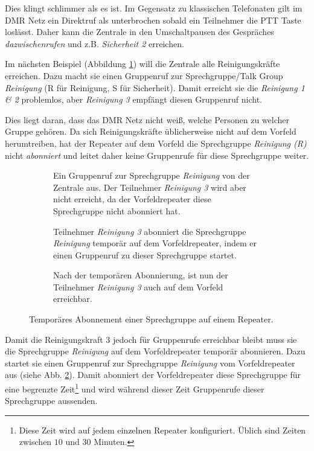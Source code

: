 Dies klingt schlimmer als es ist. Im Gegensatz zu klassischen Telefonaten gilt im DMR Netz ein Direktruf als unterbrochen sobald ein Teilnehmer die PTT Taste loslässt. Daher kann die Zentrale in den Umschaltpausen des Gespräches \emph{dazwischenrufen} und z.B. \emph{Sicherheit 2} erreichen. 

Im nächsten Beispiel (Abbildung \ref{fig:exnet3}) will die Zentrale alle Reinigungskräfte erreichen. Dazu macht sie einen Gruppenruf zur Sprechgruppe/Talk Group \emph{Reinigung} (R für Reinigung, S für Sicherheit). Damit erreicht sie die \emph{Reinigung 1 \& 2} problemlos, aber \emph{Reinigung 3} empfängt diesen Gruppenruf nicht. 

Dies liegt daran, dass das DMR Netz nicht weiß, welche Personen zu welcher Gruppe gehören. Da sich Reinigungskräfte üblicherweise nicht auf dem Vorfeld herumtreiben, hat der Repeater auf dem Vorfeld die Sprechgruppe \emph{Reinigung (R)} nicht \emph{abonniert} und leitet daher keine Gruppenrufe für diese Sprechgruppe weiter. 

\begin{figure}[p]
 \begin{subfigure}{\linewidth}
  \centering
  
  \caption{Ein Gruppenruf zur Sprechgruppe \emph{Reinigung} von der Zentrale aus. Der Teilnehmer \emph{Reinigung 3} wird aber nicht erreicht, da der Vorfeldrepeater diese Sprechgruppe nicht abonniert hat.} \label{fig:exnet3}
 \end{subfigure}\vspace{0.5cm}
 \begin{subfigure}{\linewidth}
  \centering
  
  \caption{Teilnehmer \emph{Reinigung 3} abonniert die Sprechgruppe \emph{Reinigung} temporär auf dem Vorfeldrepeater, indem er einen Gruppenruf zu dieser Sprechgruppe startet.} \label{fig:exnet4a} 
 \end{subfigure}\vspace{.5cm}
 \begin{subfigure}{\linewidth}
  \centering
  
  \caption{Nach der temporären Abonnierung, ist nun der Teilnehmer \emph{Reinigung 3} auch auf dem Vorfeld erreichbar.} \label{fig:exnet4b}
 \end{subfigure}
 \caption{Temporäres Abonnement einer Sprechgruppe auf einem Repeater.} \label{fig:exnet4}
\end{figure}

Damit die Reinigungskraft 3 jedoch für Gruppenrufe erreichbar bleibt muss sie die Sprechgruppe \emph{Reinigung} auf dem Vorfeldrepeater temporär abonnieren. Dazu startet sie einen Gruppenruf zur Sprechgruppe \emph{Reinigung} vom Vorfeldrepeater aus (siehe Abb. \ref{fig:exnet4a}). Damit abonniert der Vorfeldrepeater diese Sprechgruppe für eine begrenzte Zeit\footnote{Diese Zeit wird auf jedem einzelnen Repeater konfiguriert. Üblich sind Zeiten zwischen $10$ und $30$ Minuten.} und wird während dieser Zeit Gruppenrufe dieser Sprechgruppe aussenden. 

